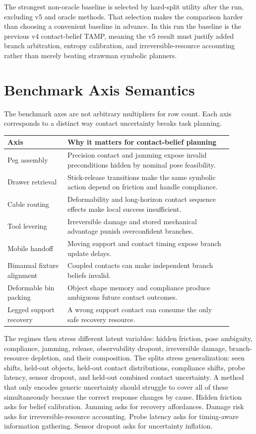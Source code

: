 \documentclass{article}
\begin{document}
The strongest non-oracle baseline is selected by hard-split utility after the run, excluding v5 and oracle methods. That selection makes the comparison harder than choosing a convenient baseline in advance. In this run the baseline is the previous v4 contact-belief TAMP, meaning the v5 result must justify added branch arbitration, entropy calibration, and irreversible-resource accounting rather than merely beating strawman symbolic planners.

\clearpage
\section{Benchmark Axis Semantics}
The benchmark axes are not arbitrary multipliers for row count. Each axis corresponds to a distinct way contact uncertainty breaks task planning.

\begin{longtable}{p{0.24\linewidth}p{0.66\linewidth}}
\toprule
Axis & Why it matters for contact-belief planning \\
\midrule
Peg assembly & Precision contact and jamming expose invalid preconditions hidden by nominal pose feasibility. \\
Drawer retrieval & Stick-release transitions make the same symbolic action depend on friction and handle compliance. \\
Cable routing & Deformability and long-horizon contact sequence effects make local success insufficient. \\
Tool levering & Irreversible damage and stored mechanical advantage punish overconfident branches. \\
Mobile handoff & Moving support and contact timing expose branch update delays. \\
Bimanual fixture alignment & Coupled contacts can make independent branch beliefs invalid. \\
Deformable bin packing & Object shape memory and compliance produce ambiguous future contact outcomes. \\
Legged support recovery & A wrong support contact can consume the only safe recovery resource. \\
\bottomrule
\end{longtable}

The regimes then stress different latent variables: hidden friction, pose ambiguity, compliance, jamming, release, observability dropout, irreversible damage, branch-resource depletion, and their composition. The splits stress generalization: seen shifts, held-out objects, held-out contact distributions, compliance shifts, probe latency, sensor dropout, and held-out combined contact uncertainty. A method that only encodes generic uncertainty should struggle to cover all of these simultaneously because the correct response changes by cause. Hidden friction asks for belief calibration. Jamming asks for recovery affordances. Damage risk asks for irreversible-resource accounting. Probe latency asks for timing-aware information gathering. Sensor dropout asks for uncertainty inflation.
\end{document}

